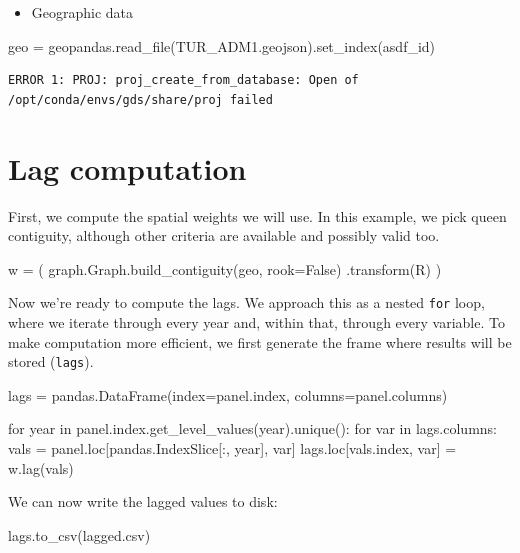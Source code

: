 \documentclass[
  letterpaper,
  DIV=11,
  numbers=noendperiod]{scrreprt}
\newenvironment{Shaded}{\begin{snugshade}}{\end{snugshade}}
\newcommand{\ControlFlowTok}[1]{\textcolor[rgb]{0.00,0.23,0.31}{#1}}
\newcommand{\KeywordTok}[1]{\textcolor[rgb]{0.00,0.23,0.31}{#1}}
\newcommand{\NormalTok}[1]{\textcolor[rgb]{0.00,0.23,0.31}{#1}}
\newcommand{\OperatorTok}[1]{\textcolor[rgb]{0.37,0.37,0.37}{#1}}
\newcommand{\StringTok}[1]{\textcolor[rgb]{0.13,0.47,0.30}{#1}}
\newcommand{\VariableTok}[1]{\textcolor[rgb]{0.07,0.07,0.07}{#1}}
\providecommand{\tightlist}{%
  \setlength{\itemsep}{0pt}\setlength{\parskip}{0pt}}\usepackage{longtable,booktabs,array}
\begin{document}
\begin{itemize}
\tightlist
\item
  Geographic data
\end{itemize}

\begin{Shaded}
\begin{Highlighting}[]
\NormalTok{geo }\OperatorTok{=}\NormalTok{ geopandas.read\_file(}\StringTok{\textquotesingle{}TUR\_ADM1.geojson\textquotesingle{}}\NormalTok{).set\_index(}\StringTok{\textquotesingle{}asdf\_id\textquotesingle{}}\NormalTok{)}
\end{Highlighting}
\end{Shaded}

\begin{verbatim}
ERROR 1: PROJ: proj_create_from_database: Open of /opt/conda/envs/gds/share/proj failed
\end{verbatim}

\section{Lag computation}\label{lag-computation}

First, we compute the spatial weights we will use. In this example, we
pick queen contiguity, although other criteria are available and
possibly valid too.

\begin{Shaded}
\begin{Highlighting}[]
\NormalTok{w }\OperatorTok{=}\NormalTok{ (}
\NormalTok{    graph.Graph.build\_contiguity(geo, rook}\OperatorTok{=}\VariableTok{False}\NormalTok{)}
\NormalTok{    .transform(}\StringTok{\textquotesingle{}R\textquotesingle{}}\NormalTok{)}
\NormalTok{)}
\end{Highlighting}
\end{Shaded}

Now we're ready to compute the lags. We approach this as a nested
\texttt{for} loop, where we iterate through every year and, within that,
through every variable. To make computation more efficient, we first
generate the frame where results will be stored (\texttt{lags}).

\begin{Shaded}
\begin{Highlighting}[]
\NormalTok{lags }\OperatorTok{=}\NormalTok{ pandas.DataFrame(index}\OperatorTok{=}\NormalTok{panel.index, columns}\OperatorTok{=}\NormalTok{panel.columns)}

\ControlFlowTok{for}\NormalTok{ year }\KeywordTok{in}\NormalTok{ panel.index.get\_level\_values(}\StringTok{\textquotesingle{}year\textquotesingle{}}\NormalTok{).unique():}
    \ControlFlowTok{for}\NormalTok{ var }\KeywordTok{in}\NormalTok{ lags.columns:}
\NormalTok{        vals }\OperatorTok{=}\NormalTok{ panel.loc[pandas.IndexSlice[:, year], var]}
\NormalTok{        lags.loc[vals.index, var] }\OperatorTok{=}\NormalTok{ w.lag(vals)}
\end{Highlighting}
\end{Shaded}

We can now write the lagged values to disk:

\begin{Shaded}
\begin{Highlighting}[]
\NormalTok{lags.to\_csv(}\StringTok{\textquotesingle{}lagged.csv\textquotesingle{}}\NormalTok{)}
\end{Highlighting}
\end{Shaded}
\end{document}
